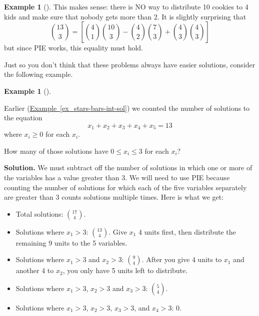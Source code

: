 \documentclass[10pt,]{book}
\theoremstyle{plain}
\theoremstyle{definition}
\newtheorem{example}[theorem]{Example}
\theoremstyle{definition}
\theoremstyle{definition}
\numberwithin{equation}{chapter}
\begin{document}
\begin{example}[]
          This makes sense: there is NO way to distribute 10 cookies to 4 kids and make sure that nobody gets more than 2. It is slightly surprising that
          \begin{equation*}
            {13 \choose 3} = \left[{4 \choose 1}{10 \choose 3} - {4 \choose 2}{7 \choose 3} + {4\choose 3}{4\choose 3}\right]
          \end{equation*}
          but since PIE works, this equality must hold.
\end{example}
\par

      Just so you don't think that these problems always have easier solutions, consider the following example.
\begin{example}[]\label{example-48}

          Earlier (\hyperref[ex_stars-bars-int-sol]{Example~\ref{ex_stars-bars-int-sol}}) we counted the number of solutions to the equation
          \begin{equation*}
            x_1 + x_2 + x_3 + x_4 + x_5 = 13
          \end{equation*}
        where \(x_i \ge 0\) for each \(x_i\).
\par

          How many of those solutions have \(0 \le x_i \le 3\) for each \(x_i\)?
\par\medskip\noindent%
\textbf{Solution.}\quad
          We must subtract off the number of solutions in which one or more of the variables has a value greater than 3. We will need to use PIE because counting the number of solutions for which each of the five variables separately are greater than 3 counts solutions multiple times. Here is what we get:
\leavevmode%
\begin{itemize}[label=\textbullet]
\item{}
              Total solutions: \({17 \choose 4}\).
\item{}
              Solutions where \(x_1 > 3\): \({13 \choose 4}\). Give \(x_1\) 4 units first, then distribute the remaining 9 units to the 5 variables.
\item{}
              Solutions where \(x_1 > 3\) and \(x_2 > 3\): \({9 \choose 4}\). After you give 4 units to \(x_1\) and another 4 to \(x_2\), you only have 5 units left to distribute.
\item{}
              Solutions where \(x_1 > 3\), \(x_2 > 3\) and \(x_3 > 3\): \({5 \choose 4}\).
\item{}
              Solutions where \(x_1 > 3\), \(x_2 > 3\), \(x_3 > 3\), and \(x_4 > 3\): 0.
\end{itemize}
\par


\end{example}
\end{document}
